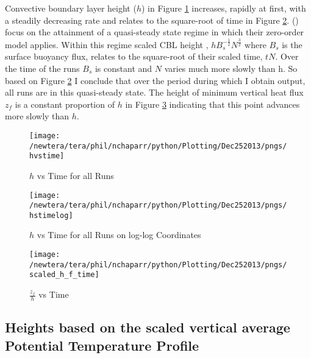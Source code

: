Convective boundary layer height ($h$) in Figure \ref{fig:hvstime} increases, rapidly at first, with a steadily decreasing rate and relates to the square-root of time in Figure \ref{fig:loghvstime}.  \citeauthor{FedConzMir04} (\citeyear{FedConzMir04})
focus on the attainment of a quasi-steady state regime in which their zero-order model applies.  Within this regime scaled \acs{CBL} height , $hB_{s}^{-\frac{1}{2}}N^{\frac{3}{2}}$ where $B_{s}$ is the surface buoyancy flux, relates to the square-root of their scaled time, $tN$. Over the time of the runs $B_{s}$ is constant and $N$ varies much more slowly than h.  So based on Figure \ref{fig:loghvstime} I conclude that over the period during which I obtain output, all runs are in this quasi-steady state. The height of minimum vertical heat flux $z_{f}$ is a constant proportion of $h$ in Figure \ref{fig:zfvstime} indicating that this point advances more slowly than $h$.\\
  
\begin{figure}[htbp]
    \centering
    \texttt{[image: /newtera/tera/phil/nchaparr/python/Plotting/Dec252013/pngs/hvstime]}
    \caption{$h$ vs Time for all Runs}
    \label{fig:hvstime}   %
\end{figure}

\begin{figure}[htbp]
    \centering
    \texttt{[image: /newtera/tera/phil/nchaparr/python/Plotting/Dec252013/pngs/hstimelog]}
    \caption{$h$ vs Time for all Runs on log-log Coordinates}
    \label{fig:loghvstime}   %
\end{figure}


\begin{figure}[htbp]
    \centering
    \texttt{[image: /newtera/tera/phil/nchaparr/python/Plotting/Dec252013/pngs/scaled\_h\_f\_time]}
    \caption{$\frac{z_{f}}{h}$ vs Time}
    \label{fig:zfvstime}   %
\end{figure}

\clearpage

\subsection{Heights based on the scaled vertical average Potential Temperature Profile}
\label{subsec:thetari}

